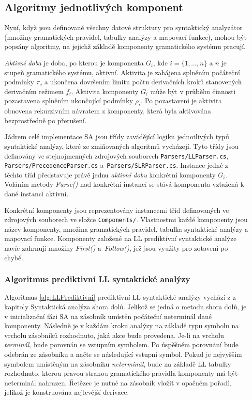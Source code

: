 \subsection*{Algoritmy jednotlivých komponent}
Nyní, když jsou definované všechny datové struktury pro syntaktický analyzátor (množiny gramatických pravidel, tabulky analýzy a mapovací funkce), mohou být popsány
algoritmy, na jejichž základě komponenty gramatického systému pracují.

\begin{definice}
  \emph{Aktivní doba} je doba, po kterou je komponenta $G_i$, kde $i = \{1, \dots, n \}$ a $n$ je stupeň gramatického systému, aktivní. Aktivita je zahájena splněním počáteční
  podmínky $\pi_i$ a ukončena dovršením limitu počtu derivačních kroků stanovených derivačním režimem $f_i$. Aktivita komponenty $G_i$ může být v průběhu činnosti pozastavena
  splněním ukončující podmínky $\rho_i$. Po pozastavení je aktivita obnovena rekurzivním návratem z komponenty, která byla aktivována bezprostředně po přerušení.
\end{definice}

Jádrem celé implementace SA jsou třídy zavádějící logiku jednotlivých typů syntaktické analýzy,
které ze zmiňovaných algoritmů vycházejí. Tyto třídy jsou definovány ve stejnojmenných zdrojových souborech \verb|Parsers/LLParser.cs|, \verb|Parsers/PrecedenceParser.cs| a~\verb|Parsers/SLRParser.cs|.
Instance jedné z těchto tříd představuje právě jednu \emph{aktivní dobu} konkrétní komponenty $G_i$. Voláním metody \emph{Parse()} nad konkrétní instancí
se stává komponenta vztažená k dané instanci aktivní.

Konkrétní komponenty jsou reprezentovány instancemi tříd definovaných ve zdrojových souborech ve složce \verb|Components/|. Vlastnostmi každé komponenty jsou
název komponenty, množina gramatických pravidel, tabulka syntaktické analýzy a mapovací funkce. Komponenty založené na LL prediktivní syntaktické analýze
navíc zahrnují množiny \emph{First()} a~\emph{Follow()}, jež jsou využity pro zotavení po chybě.

\subsubsection*{Algoritmus prediktivní LL syntaktické analýzy}

Algoritmus \ref{alg:LLPrediktivni} prediktivní LL syntaktické analýzy vychází z \cite{IFJ:2017} z kapitoly Syntaktická analýza shora dolů. Jelikož se jedná o metodu
shora dolů, je v inicializační fázi SA na zásobník umístěn počáteční neterminál dané komponenty. Následně je v každám kroku analýzy na základě typu symbolu na vrcholu
zásobníků rozhodnuto, jaká akce bude provedena. Je-li na vrcholu \emph{terminál}, bude porovnán se vstupním symbolem. Po úspěšném porovnání bude odebrán ze zásobníku a načte se následující vstupní symbol. Pokud
je nejvyšším symbolem umístěným na zásobníku \emph{neterminál}, bude na základě LL tabulky rozhodnuto, kterou pravou stranou gramatického pravidla komponenty má být neterminál nahrazen. Řetězec
je nutné na zásobník vložit v opačném pořadí, jelikož je konstruována nejlevější derivace.

